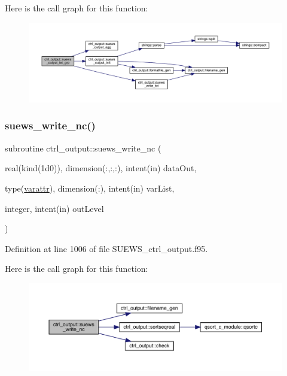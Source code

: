 Here is the call graph for this function\+:\nopagebreak
\begin{figure}[H]
\begin{center}
\leavevmode
\includegraphics[width=350pt]{namespacectrl__output_ac3541cbdb88f9028bc3592ee65b64980_cgraph}
\end{center}
\end{figure}
\mbox{\label{namespacectrl__output_a34f8d939c96cb60cdf1f9739e1ea4672}} 
\subsubsection{\texorpdfstring{suews\+\_\+write\+\_\+nc()}{suews\_write\_nc()}}
{\footnotesize\ttfamily subroutine ctrl\+\_\+output\+::suews\+\_\+write\+\_\+nc (\begin{DoxyParamCaption}\item[{real(kind(1d0)), dimension(\+:,\+:,\+:), intent(in)}]{data\+Out,  }\item[{type(\hyperlink{structctrl__output_1_1varattr}{varattr}), dimension(\+:), intent(in)}]{var\+List,  }\item[{integer, intent(in)}]{out\+Level }\end{DoxyParamCaption})}



Definition at line 1006 of file S\+U\+E\+W\+S\+\_\+ctrl\+\_\+output.\+f95.

Here is the call graph for this function\+:\nopagebreak
\begin{figure}[H]
\begin{center}
\leavevmode
\includegraphics[width=350pt]{namespacectrl__output_a34f8d939c96cb60cdf1f9739e1ea4672_cgraph}
\end{center}
\end{figure}
\mbox{\label{namespacectrl__output_a84e30d3564e406535ea078c470a62668}} 
